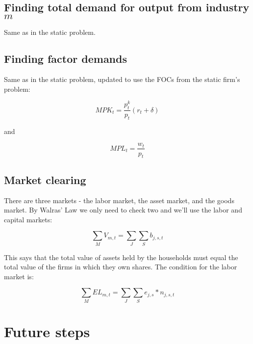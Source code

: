 \documentclass[letterpaper,12pt]{article}
\theoremstyle{definition}
\begin{document}
\subsection*{Finding total demand for output from industry $m$}

Same as in the static problem.

\subsection*{Finding factor demands}

Same as in the static problem, updated to use the FOCs from the static firm's problem:

\begin{equation}
MPK_{t} = \frac{p^{k}_{t}}{p_{t}}(r_{t}+\delta)
\end{equation}

and

\begin{equation}
MPL_{t} = \frac{w_{t}}{p_{t}}
\end{equation}

\subsection*{Market clearing}

There are three markets - the labor market, the asset market, and the goods market.  By Walras' Law we only need to check two and we'll use the labor and capital markets:

\begin{equation}
\sum_{M} V_{m,t} = \sum_{J}\sum_{S}b_{j,s,t}
\end{equation}

\noindent\noindent This says that the total value of assets held by the households must equal the total value of the firms in which they own shares. The condition for the labor market is: 

\begin{equation}
\sum_{M} EL_{m,t} = \sum_{J}\sum_{S}e_{j,s}*n_{j,s,t}
\end{equation}


\section*{Future steps}
\end{document}
